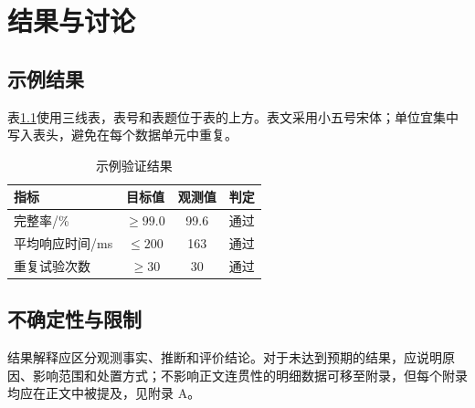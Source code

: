 \chapter{结果与讨论}

\section{示例结果}

表\ref{tab:result}使用三线表，表号和表题位于表的上方。表文采用小五号宋体；单位宜集中写入表头，避免在每个数据单元中重复。

\begin{table}[htbp]
  \centering
  \caption{示例验证结果}
  \label{tab:result}
  \ReportTableText
  \begin{tabular}{lccc}
    \toprule
    指标 & 目标值 & 观测值 & 判定 \\
    \midrule
    完整率/\% & $\geq 99.0$ & 99.6 & 通过 \\
    平均响应时间/ms & $\leq 200$ & 163 & 通过 \\
    重复试验次数 & $\geq 30$ & 30 & 通过 \\
    \bottomrule
  \end{tabular}
\end{table}

\section{不确定性与限制}

结果解释应区分观测事实、推断和评价结论。对于未达到预期的结果，应说明原因、影响范围和处置方式；不影响正文连贯性的明细数据可移至附录，但每个附录均应在正文中被提及，见附录 A。
